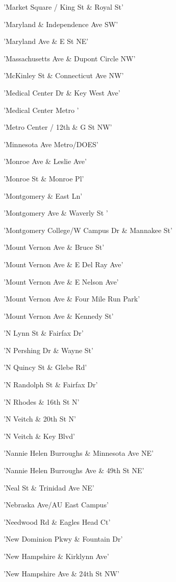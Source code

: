 \documentclass[11pt]{article}
\begin{document}
\begin{enumerate*}
\item 'Market Square / King St \& Royal St'
\item 'Maryland \& Independence Ave SW'
\item 'Maryland Ave \& E St NE'
\item 'Massachusetts Ave \& Dupont Circle NW'
\item 'McKinley St \& Connecticut Ave NW'
\item 'Medical Center Dr \& Key West Ave'
\item 'Medical Center Metro '
\item 'Metro Center / 12th \& G St NW'
\item 'Minnesota Ave Metro/DOES'
\item 'Monroe Ave \& Leslie Ave'
\item 'Monroe St \& Monroe Pl'
\item 'Montgomery \& East Ln'
\item 'Montgomery Ave \& Waverly St '
\item 'Montgomery College/W Campus Dr \& Mannakee St'
\item 'Mount Vernon Ave \& Bruce St'
\item 'Mount Vernon Ave \& E Del Ray Ave'
\item 'Mount Vernon Ave \& E Nelson Ave'
\item 'Mount Vernon Ave \& Four Mile Run Park'
\item 'Mount Vernon Ave \& Kennedy St'
\item 'N Lynn St \& Fairfax Dr'
\item 'N Pershing Dr \& Wayne St'
\item 'N Quincy St \& Glebe Rd'
\item 'N Randolph St \& Fairfax Dr'
\item 'N Rhodes \& 16th St N'
\item 'N Veitch  \& 20th St N'
\item 'N Veitch \& Key Blvd'
\item 'Nannie Helen Burroughs \& Minnesota Ave NE'
\item 'Nannie Helen Burroughs Ave \& 49th St NE'
\item 'Neal St \& Trinidad Ave NE'
\item 'Nebraska Ave/AU East Campus'
\item 'Needwood Rd \& Eagles Head Ct'
\item 'New Dominion Pkwy \& Fountain Dr'
\item 'New Hampshire \& Kirklynn Ave'
\item 'New Hampshire Ave \& 24th St NW'

\end{enumerate*}
\end{document}
